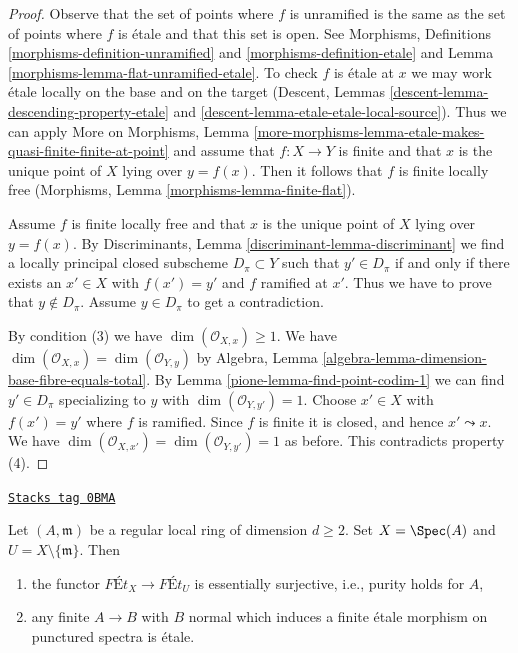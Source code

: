 \begin{proof}

Observe that the set of points where $f$ is unramified is the same as
the set of points where $f$ is \'etale and that this set is open.
See Morphisms, Definitions \ref{morphisms-definition-unramified}
and \ref{morphisms-definition-etale} and
Lemma \ref{morphisms-lemma-flat-unramified-etale}.
To check $f$ is \'etale at $x$ we may work \'etale
locally on the base and on the
target (Descent, Lemmas \ref{descent-lemma-descending-property-etale} and
\ref{descent-lemma-etale-etale-local-source}).
Thus we can apply More on Morphisms, Lemma
\ref{more-morphisms-lemma-etale-makes-quasi-finite-finite-at-point}
and assume that $f : X \to Y$ is finite and that $x$ is the unique
point of $X$ lying over $y = f(x)$.
Then it follows that $f$ is finite locally free
(Morphisms, Lemma \ref{morphisms-lemma-finite-flat}).

\medskip\noindent
Assume $f$ is finite locally free and that $x$ is the unique point of
$X$ lying over $y = f(x)$. By
Discriminants, Lemma \ref{discriminant-lemma-discriminant}
we find a locally principal closed subscheme $D_\pi \subset Y$
such that $y' \in D_\pi$ if and only if there exists an $x' \in X$
with $f(x') = y'$ and $f$ ramified at $x'$. Thus we have to prove
that $y \not \in D_\pi$. Assume $y \in D_\pi$ to get a contradiction.

\medskip\noindent
By condition (3) we have $\dim(\mathcal{O}_{X, x}) \geq 1$.
We have $\dim(\mathcal{O}_{X, x}) = \dim(\mathcal{O}_{Y, y})$ by
Algebra, Lemma \ref{algebra-lemma-dimension-base-fibre-equals-total}.
By Lemma \ref{pione-lemma-find-point-codim-1}
we can find $y' \in D_\pi$ specializing to $y$
with $\dim(\mathcal{O}_{Y, y'}) = 1$.
Choose $x' \in X$ with $f(x') = y'$ where $f$ is ramified. Since $f$
is finite it is closed, and hence $x' \leadsto x$.
We have $\dim(\mathcal{O}_{X, x'}) = \dim(\mathcal{O}_{Y, y'}) = 1$
as before. This contradicts property (4).
\end{proof}

\begin{lemma}
\label{pione-lemma-local-purity}
\href{https://stacks.math.columbia.edu/tag/0BMA}{\texttt{Stacks tag 0BMA}}

Let $(A, \mathfrak m)$ be a regular local ring of dimension $d \geq 2$.
Set $X = \Spec(A)$ and $U = X \setminus \{\mathfrak m\}$. Then
\begin{enumerate}
\item the functor $\textit{F\'Et}_X \to \textit{F\'Et}_U$
is essentially surjective, i.e., purity holds for $A$,
\item any finite $A \to B$ with $B$ normal which
induces a finite \'etale morphism on punctured spectra is \'etale.
\end{enumerate}
\end{lemma}

